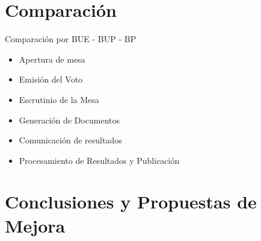 \documentclass{llncs}
\begin{document}
\section{Comparación}
Comparación por BUE - BUP - BP

\begin{itemize}
\item Apertura de mesa
\item Emisión del Voto
\item Escrutinio de la Mesa
\item Generación de Documentos
\item Comunicación de resultados
\item Procesamiento de Resultados y Publicación
\end{itemize}










\section{Conclusiones y Propuestas de Mejora}










%


\end{document}

